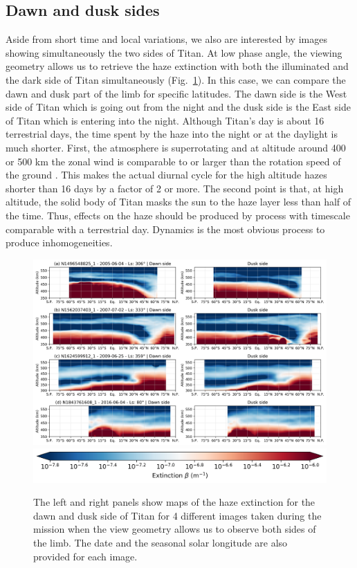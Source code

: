 \subsection{Dawn and dusk sides}

Aside from short time and local variations, we also are interested by images showing simultaneously the two sides
of Titan. At low phase angle, the viewing geometry allows us to retrieve the haze extinction with both the
illuminated and the dark side of Titan simultaneously  (Fig.~\ref{fig:dawn_dusk}).
In this case, we can compare the dawn and dusk part of the limb for
specific latitudes. The dawn side is the West side of Titan which is going out from the night and the
dusk side is the East side of Titan which is entering into the night. Although Titan's day is about 16 terrestrial
days, the time spent by the haze into the night or at the daylight is much shorter.
First, the atmosphere is superrotating and at altitude around 400 or 500 km the zonal wind is comparable to or
larger than the rotation speed of the ground \citep{Flasar2005, Achterberg2011, Lebonnois2012, Lellouch2019}.
This makes the actual diurnal cycle for the high altitude hazes shorter than 16 days by a factor of 2 or more.
The second point is that, at high altitude, the solid body of Titan masks the sun to the haze layer less than
half of the time. Thus, effects on the haze should be produced by process with timescale
comparable with a terrestrial day. Dynamics is the most obvious process to produce inhomogeneities.

\begin{figure}[!ht]
    \centering
    \includegraphics[width=\textwidth]{Fig/Dawn_dusk.png}
    \includegraphics[width=.5\textwidth]{Fig/Extinction_colorbar.png}\vspace{-.3cm}
    \caption{The left and right panels show maps of the haze extinction for the dawn and dusk side of
    Titan for 4 different images taken during the mission when the view geometry allows us to observe both sides
    of the limb. The date and the seasonal solar longitude are also provided for each image.}
    \label{fig:dawn_dusk}
\end{figure}

